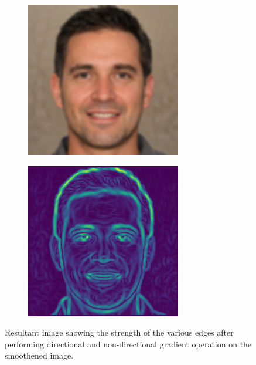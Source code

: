 \documentclass{70_styles/svproc}
\begin{document}
\begin{figure}
     \centering
     \begin{subfigure}[b]{0.2\textwidth}
         \centering
         \includegraphics[width=\textwidth]{70_figures/smoothened-seed1830.png}
     \end{subfigure}
     \begin{subfigure}[b]{0.2\textwidth}
         \centering
         \includegraphics[width=\textwidth]{70_figures/nondd-seed1830.png}
     \end{subfigure}
     \caption{Resultant image showing the strength of the various edges after performing directional and non-directional gradient operation on the smoothened image.}
\end{figure}
\end{document}
